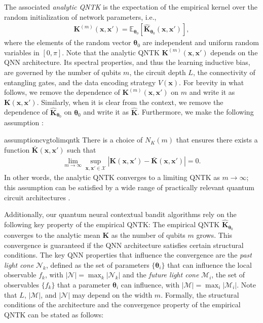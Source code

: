 \documentclass[pdflatex,sn-mathphys-num]{sn-jnl}%
\theoremstyle{thmstyleone}%
\theoremstyle{thmstyletwo}%
\theoremstyle{thmstylethree}%
\newcommand{\xbf}{\mathbf{x}}
\newcommand{\Kbf}{\mathbf{K}}
\newcommand{\thetabf}{\bm{\theta}}
\begin{document}
The associated \emph{analytic QNTK} is the expectation of the empirical kernel over the random initialization of network parameters, i.e.,  \begin{align}\Kbf^{(m)}(\xbf, \xbf') = \mathbb{E}_{{\thetabf}_0}[\hat{\Kbf}_{{\thetabf}_0}(\xbf, \xbf')], \end{align} where the elements of the random vector $\bm{\theta}_0$ are  independent and uniform random variables in $[0,\pi]$. Note that the analytic QNTK  $\Kbf^{(m)}(\xbf, \xbf')$ depends on the QNN architecture. Its spectral properties, and thus the learning inductive bias, are governed by the number of qubits $m$, the circuit depth $L$, the connectivity of entangling gates, and the data encoding strategy $V(\xbf)$.  For brevity in what follows, we remove the dependence of $\Kbf^{(m)}(\xbf, \xbf')$ on $m$ and write it as $\Kbf(\xbf, \xbf')$. Similarly, when it is clear from the context, we remove the dependence of $\hat{\Kbf}_{\thetabf_0}$ on $\thetabf_0$ and write it as $\hat{\Kbf}$.
Furthermore, we make the following assumption \cite{Girardi2025}:

\begin{restatable}{assumption}{cvgtolimqntk}\label{ass:cvgtolimqntk}
    There is a choice of $N_K(m)$ that ensures there exists a function $\bar{\Kbf}(\xbf,\xbf')$ such that
    \begin{align}
        \lim_{m \rightarrow \infty} \sup_{\xbf,\xbf' \in \mathcal{X}} | \Kbf(\xbf,\xbf')-\bar{\Kbf}(\xbf,\xbf')|=0.
    \end{align}
    In other words, the analytic QNTK converges to a limiting QNTK as $m \rightarrow \infty$; this assumption can be satisfied by a wide range of practically relevant quantum circuit architectures \cite{Girardi2025}. %
\end{restatable}

Additionally, our quantum neural contextual bandit algorithms  rely on the following key property of the empirical QNTK: The empirical QNTK $\hat{\Kbf}_{{\thetabf}_0}$ converges to the analytic mean $\Kbf$ as the number of qubits $m$  grows. This convergence is guaranteed if the QNN architecture satisfies certain structural conditions.  The key QNN properties that influence the convergence are the \emph{past light cone} $\mathcal{N}_k$, defined as the set of parameters $\{{\thetabf}_i\}$ that can influence the local observable $f_k$, with $|\mathcal{N}| = \max_k |\mathcal{N}_k|$ and the \emph{future light cone} $\mathcal{M}_i$, the set of observables $\{f_k\}$ that a parameter ${\thetabf}_i$ can influence, with $|\mathcal{M}| = \max_i |\mathcal{M}_i|$. Note that $L$, $|\mathcal{M}|$, and $|\mathcal{N}|$  may depend on the width $m$. Formally, the structural conditions of the architecture and the convergence property of the empirical QNTK can be stated as follows:
\end{document}

